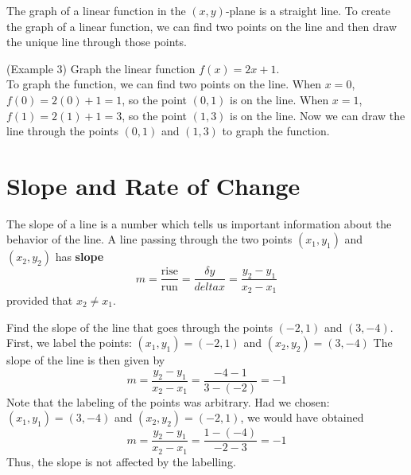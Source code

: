 \documentclass[handout]{ximera}
\begin{document}
The graph of a linear function in the $(x,y)$-plane is a straight line.
To create the graph of a linear function, we can find two points on the line and then draw the unique line through those points.
\begin{example}(Example 3)
Graph the linear function $f(x) = 2x + 1$.\\
To graph the function, we can find two points on the line.
When $x = 0$, $f(0) = 2(0) + 1 = 1$, so the point $(0,1)$ is on the line.
When $x = 1$, $f(1) = 2(1) + 1 = 3$, so the point $(1,3)$ is on the line.
Now we can draw the line through the points $(0,1)$ and $(1,3)$ to graph the function.


\begin{image}
\end{image}
\end{example}   

\section{Slope and Rate of Change}
The slope of a line is a number which tells us important information about the behavior of the line.
A line passing through the two points $(x_1, y_1)$ and $(x_2, y_2)$ has \textbf{slope}
\[
m = \frac{\text{rise}}{{\text{run}}} = \frac{\delta y}{delta x} = \frac{y_2 - y_1}{x_2 - x_1}
\]
provided that $x_2 \neq x_1$.
\begin{example}[Example 4]
Find the slope of the line that goes through the points $(-2, 1)$ and $(3, -4)$.\\
First, we label the points: $(x_1, y_1) = (-2, 1)$ and $(x_2, y_2) = (3, -4)$
The slope of the line is then given by
\[
m = \frac{y_2 - y_1}{x_2 - x_1} = \frac{-4-1}{3-(-2)}= -1
\]
Note that the labeling of the points was arbitrary. Had we chosen:
$(x_1, y_1) = (3, -4)$ and $(x_2, y_2) = (-2, 1)$, 
we would have obtained
\[
m = \frac{y_2 - y_1}{x_2 - x_1} = \frac{1-(-4)}{-2-3}= -1
\]
Thus, the slope is not affected by the labelling.
\end{example}
\end{document}
